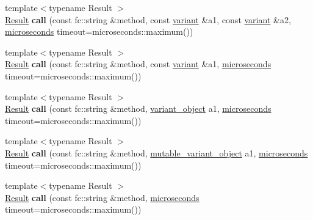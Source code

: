 \begin{Indent}
\begin{DoxyCompactItemize}
\item 
\mbox{\label{classfc_1_1rpc_1_1json__connection_a2aeee878febe6906bef34534d771d5f7}} 
{\footnotesize template$<$typename Result $>$ }\\\mbox{\hyperlink{struct_result}{Result}} {\bfseries call} (const fc\+::string \&method, const \mbox{\hyperlink{classfc_1_1variant}{variant}} \&a1, const \mbox{\hyperlink{classfc_1_1variant}{variant}} \&a2, \mbox{\hyperlink{classfc_1_1microseconds}{microseconds}} timeout=microseconds\+::maximum())
\item 
\mbox{\label{classfc_1_1rpc_1_1json__connection_a86b1f3c1e505ede217b1ee9d2fd8d4f6}} 
{\footnotesize template$<$typename Result $>$ }\\\mbox{\hyperlink{struct_result}{Result}} {\bfseries call} (const fc\+::string \&method, const \mbox{\hyperlink{classfc_1_1variant}{variant}} \&a1, \mbox{\hyperlink{classfc_1_1microseconds}{microseconds}} timeout=microseconds\+::maximum())
\item 
\mbox{\label{classfc_1_1rpc_1_1json__connection_a3f1a677c35eeaff518084762eef999ea}} 
{\footnotesize template$<$typename Result $>$ }\\\mbox{\hyperlink{struct_result}{Result}} {\bfseries call} (const fc\+::string \&method, \mbox{\hyperlink{classfc_1_1variant__object}{variant\+\_\+object}} a1, \mbox{\hyperlink{classfc_1_1microseconds}{microseconds}} timeout=microseconds\+::maximum())
\item 
\mbox{\label{classfc_1_1rpc_1_1json__connection_abf6e8a4bfa871284f71349fb89611d40}} 
{\footnotesize template$<$typename Result $>$ }\\\mbox{\hyperlink{struct_result}{Result}} {\bfseries call} (const fc\+::string \&method, \mbox{\hyperlink{classfc_1_1mutable__variant__object}{mutable\+\_\+variant\+\_\+object}} a1, \mbox{\hyperlink{classfc_1_1microseconds}{microseconds}} timeout=microseconds\+::maximum())
\item 
\mbox{\label{classfc_1_1rpc_1_1json__connection_a5b6fd1a8bbbe7a8f839c9b97401039d9}} 
{\footnotesize template$<$typename Result $>$ }\\\mbox{\hyperlink{struct_result}{Result}} {\bfseries call} (const fc\+::string \&method, \mbox{\hyperlink{classfc_1_1microseconds}{microseconds}} timeout=microseconds\+::maximum())

\end{DoxyCompactItemize}
\end{Indent}
